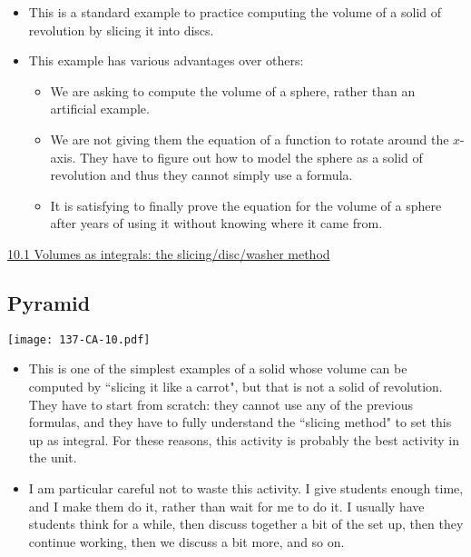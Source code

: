 \documentclass[11pt]{article}
\newcommand{\nl}{\hfill \vspace{-1.1\baselineskip}} %
\newcommand{\vi}{\hspace{8mm}\href{https://www.youtube.com/watch?v=Kq9Q5LISo5o&list=PLlwePzQY_wW9f22c89JAQBzaa-9XgESA8}{10.1 Volumes as integrals: the slicing/disc/washer method}}
\begin{document}
\begin{comments}
\nl
	\begin{itemize}
		\item This is a standard example to practice computing the volume of a solid of revolution by slicing it into discs.
		\item This example has various advantages over others:
			\begin{itemize}
				\item We are asking to compute the volume of a sphere, rather than an artificial example.
				\item	 We are not giving them the equation of a function to rotate around the $x$-axis.  They have to figure out how to model the sphere as a solid of revolution and thus they cannot simply use a formula.
				\item  It is satisfying to finally prove the equation for the volume of a sphere after years of using it without knowing where it came from.
			\end{itemize}
	\end{itemize}
\end{comments}

\begin{videos}
\vi
\end{videos}

\newpage
\subsection{Pyramid}

\begin{center}
{ \texttt{[image: 137-CA-10.pdf]}} 
\end{center}

\begin{comments}
\nl
	\begin{itemize}
		\item   This is one of the simplest examples of a solid whose volume can be computed by ``slicing it like a carrot", but that is not a solid of revolution.  They have to start from scratch: they cannot use any of the previous formulas, and they have to fully understand the ``slicing method" to set this up as integral.  For these reasons, this activity is probably the best activity in the unit.
		\item I am particular careful not to waste this activity.  I give students enough time, and I make them do it, rather than wait for me to do it. I usually have students think for a while, then discuss together a bit of the set up, then they continue working, then we discuss a bit more, and so on.
	\end{itemize}
\end{comments}
\end{document}
